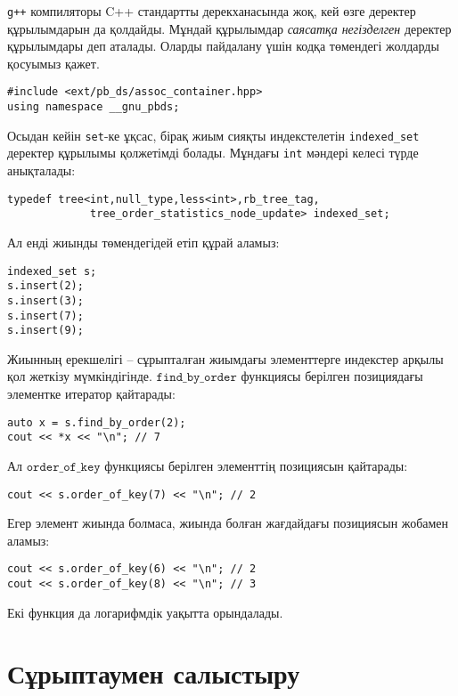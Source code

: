 \texttt{g++} компиляторы 
C++ стандартты дерекханасында жоқ, кей өзге 
деректер құрылымдарын да қолдайды. Мұндай құрылымдар 
\emph{саясатқа негізделген} деректер құрылымдары деп аталады.
Оларды пайдалану үшін кодқа төмендегі жолдарды қосуымыз қажет.
\begin{lstlisting}
#include <ext/pb_ds/assoc_container.hpp>
using namespace __gnu_pbds; 
\end{lstlisting}
Осыдан кейін \texttt{set}-ке ұқсас, бірақ жиым сияқты индекстелетін
\texttt{indexed\_set} деректер құрылымы қолжетімді болады.
Мұндағы \texttt{int} мәндері келесі түрде анықталады:
\begin{lstlisting}
typedef tree<int,null_type,less<int>,rb_tree_tag,
             tree_order_statistics_node_update> indexed_set; 
\end{lstlisting}
Ал енді жиынды төмендегідей етіп құрай аламыз:
\begin{lstlisting}
indexed_set s;
s.insert(2);
s.insert(3);
s.insert(7);
s.insert(9);
\end{lstlisting}
Жиынның ерекшелігі -- сұрыпталған жиымдағы элементтерге индекстер арқылы қол жеткізу мүмкіндігінде.
$\texttt{find\_by\_order}$ функциясы берілген позициядағы элементке итератор қайтарады:
\begin{lstlisting}
auto x = s.find_by_order(2);
cout << *x << "\n"; // 7
\end{lstlisting}
Ал $\texttt{order\_of\_key}$ функциясы берілген элементтің позициясын қайтарады:
\begin{lstlisting}
cout << s.order_of_key(7) << "\n"; // 2
\end{lstlisting}
Егер элемент жиында болмаса, жиында болған жағдайдағы позициясын жобамен
аламыз:
\begin{lstlisting}
cout << s.order_of_key(6) << "\n"; // 2
cout << s.order_of_key(8) << "\n"; // 3
\end{lstlisting}
Екі функция да логарифмдік уақытта орындалады.

\section{Сұрыптаумен салыстыру}

